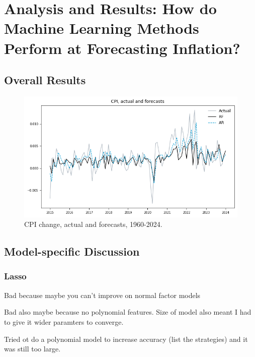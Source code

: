 \pagebreak
\section{Analysis and Results: How do Machine Learning Methods Perform at Forecasting Inflation?} \label{sec:analysis}

\subsection{Overall Results}


\begin{figure}[H]
    \centering
    \includegraphics[width=1\linewidth]{figures/forecasts.png}
    \vspace{-30pt}
    \caption{CPI change, actual and forecasts, 1960-2024.}
    \label{fig:cpi} 
\end{figure}


\subsection{Model-specific Discussion}

\subsubsection{Lasso}

Bad because maybe you can't improve on normal factor models \autocite{GouletCoulombe2022HowForecasting}

Bad also maybe because no polynomial features. Size of model also meant I had to give it wider paramters to converge.

Tried ot do a polynomial model to increase accuracy (list the strategies) and it was still too large. 